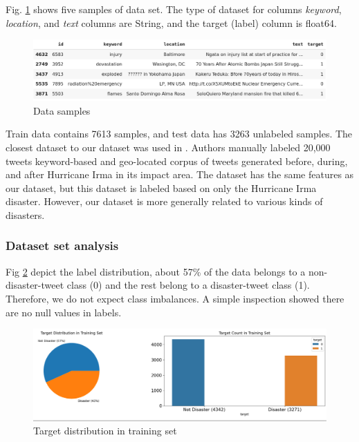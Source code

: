 \documentclass[sigconf]{acmart}
\begin{document}
Fig. \ref{fig:sample} shows five samples of data set. The type of dataset for columns \textit{keyword}, \textit{location}, and \textit{text} columns are String, and the target (label) column is float64. 
\begin{figure}[h]
  \centering
  \includegraphics[width=\linewidth]{trainsample.png}
  \caption{Data samples}
  \label{fig:sample}
\end{figure}

Train data contains 7613 samples, and test data has 3263 unlabeled samples. The closest dataset to our dataset was used in \cite{sit2019identifying}. Authors manually labeled 20,000 tweets keyword-based and geo-located corpus of tweets generated before, during, and after Hurricane Irma in its impact area. The dataset has the same features as our dataset, but this dataset is labeled based on only the Hurricane Irma disaster. However, our dataset is more generally related to various kinds of disasters. 

\subsubsection{Dataset set analysis}

Fig \ref{fig:targetdist} depict the label distribution, about 57\% of the data belongs to a non-disaster-tweet class (0) and the rest belong to a disaster-tweet class (1). Therefore, we do not expect class imbalances. A simple inspection showed there are no null values in labels. 
\begin{figure}[h]
  \centering
  \includegraphics[width=\linewidth]{targetDist.png}
  \caption{Target distribution in training set}
  \label{fig:targetdist}
\end{figure}
\end{document}
